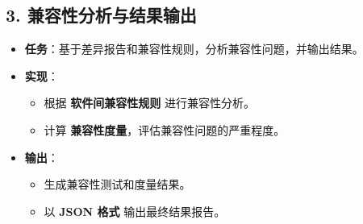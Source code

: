 \documentclass[14pt,a4paper,UTF8,twoside]{article}
\begin{document}
\begin{multicols}{3}
    \columnbreak %

    \subsection*{3. 兼容性分析与结果输出}
    \begin{itemize}
        \item \textbf{任务}：基于差异报告和兼容性规则，分析兼容性问题，并输出结果。
        \item \textbf{实现}：
        \begin{itemize}
            \item 根据 \textbf{软件间兼容性规则} 进行兼容性分析。
            \item 计算 \textbf{兼容性度量}，评估兼容性问题的严重程度。
        \end{itemize}
        \item \textbf{输出}：
        \begin{itemize}
            \item 生成兼容性测试和度量结果。
            \item 以 \textbf{JSON 格式} 输出最终结果报告。
        \end{itemize}
    \end{itemize}

\end{multicols}
\end{document}
